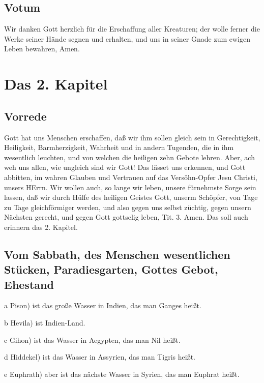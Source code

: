 \section{Votum}

Wir danken Gott herzlich für die Erschaffung aller Kreaturen; der wolle ferner die Werke seiner Hände segnen und erhalten, und uns in seiner Gnade zum ewigen Leben bewahren, Amen.
\chapter{Das 2. Kapitel}

\section{Vorrede}


Gott hat uns Menschen erschaffen, daß wir ihm sollen gleich sein in Gerechtigkeit, Heiligkeit, Barmherzigkeit, Wahrheit und in andern Tugenden, die in ihm wesentlich leuchten, und von welchen die heiligen zehn Gebote lehren. Aber, ach weh uns allen, wie ungleich sind wir Gott! Das lässet uns erkennen, und Gott abbitten, im wahren Glauben und Vertrauen auf das Versöhn-Opfer Jesu Christi, unsers HErrn. Wir wollen auch, so lange wir leben, unsere fürnehmste Sorge sein lassen, daß wir durch Hülfe des heiligen Geistes Gott, unserm Schöpfer, von Tage zu Tage gleichförmiger werden, und also gegen uns selbst züchtig, gegen unsern Nächsten gerecht, und gegen Gott gottselig leben, Tit. 3. Amen. Das soll auch erinnern das 2. Kapitel.

\section[Vom Sabbath, des Menschen wesentlichen Stücken, Paradiesgarten, Gottes]{Vom Sabbath, des Menschen wesentlichen Stücken, Paradiesgarten, Gottes Gebot, Ehestand}





a Pison) ist das große Wasser in Indien, das man Ganges heißt.

b Hevila) ist Indien-Land.

c Gihon) ist das Wasser in Aegypten, das man Nil heißt.


d Hiddekel) ist das Wasser in Assyrien, das man Tigris heißt.

e Euphrath) aber ist das nächste Wasser in Syrien, das man Euphrat heißt.




